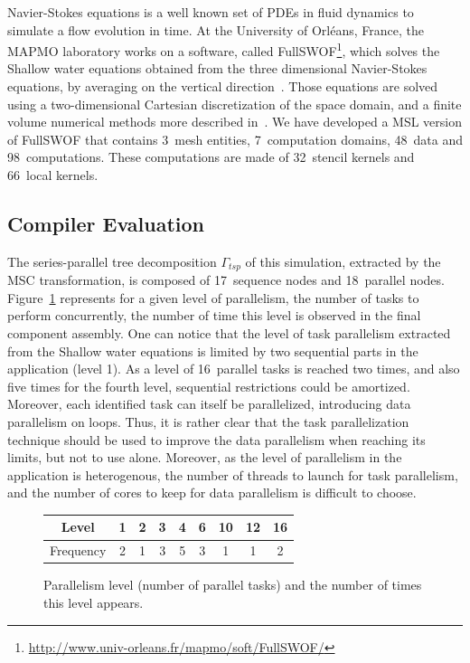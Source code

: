 Navier-Stokes equations is a well known set of PDEs in fluid dynamics to simulate a flow evolution in time. At the University of Orl\'eans, France, the MAPMO laboratory works on a software, called FullSWOF\footnote{\url{http://www.univ-orleans.fr/mapmo/soft/FullSWOF/}}, which solves the Shallow water equations obtained from the three dimensional Navier-Stokes equations, by averaging on the vertical direction~\cite{Ferrari2004}. Those equations are solved using a two-dimensional Cartesian discretization of the space domain, and a finite volume numerical methods more described in~\cite{CPE:CPE3494}. We have developed a MSL version of FullSWOF that contains 3~mesh entities, 7~computation domains, 48~data and 98~computations. These computations are made of 32~stencil kernels and 66~local kernels.

\subsection{Compiler Evaluation}

The series-parallel tree decomposition $\Gamma_{tsp}$ of this simulation, extracted by the MSC transformation, is composed of 17~sequence nodes and 18~parallel nodes. Figure~\ref{fig:freq} represents for a given level of parallelism, \ie the number of tasks to perform concurrently, the number of time this level is observed in the final component assembly. One can notice that the level of task parallelism extracted from the Shallow water equations is limited by two sequential parts in the application (level 1). As a level of 16~parallel tasks is reached two times, and also five times for the fourth level, sequential restrictions could be amortized. Moreover, each identified task can itself be parallelized, introducing data parallelism on loops. Thus, it is rather clear that the task parallelization technique should be used to improve the data parallelism when reaching its limits, but not to use alone. Moreover, as the level of parallelism in the application is heterogenous, the number of threads to launch for task parallelism, and the number of cores to keep for data parallelism is difficult to choose.

\begin{figure}[!h]
 \begin{center}
 \begin{tabular}{|c|c|c|c|c|c|c|c|c|}
    \hline 
   Level & 1 & 2 & 3 & 4 & 6 & 10 & 12 & 16\\
   \hline
   Frequency & 2 & 1 & 3 & 5 & 3 & 1 & 1 & 2\\
   \hline
 \end{tabular}
\caption{Parallelism level (number of parallel tasks) and the number of times this level appears.}
\label{fig:freq}
 \end{center}
\end{figure}

